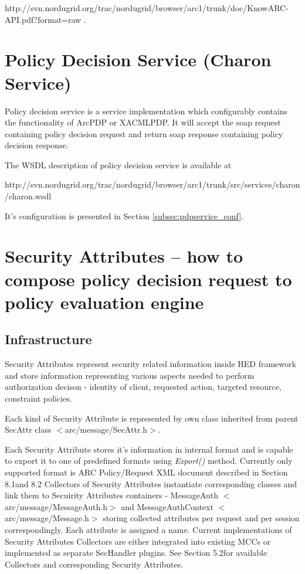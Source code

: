 \documentclass{article}                            %
\begin{document}
http://svn.nordugrid.org/trac/nordugrid/browser/arc1/trunk/doc/KnowARC-API.pdf?format=raw .



\section{Policy Decision Service (Charon Service)} %
\label{sec:policy_decision_service}
Policy decision service is a service implementation which configurably contains the functionality of ArcPDP or XACMLPDP. It will accept the soap request containing policy decision request and return soap response containing policy decision response.

The WSDL description of policy decision service is available at

 http://svn.nordugrid.org/trac/nordugrid/browser/arc1/trunk/src/services/charon/charon.wsdl

It's configuration is presented in Section \ref{subsec:pdpservice_conf}. 



\section{Security Attributes -- how to compose policy decision request to policy evaluation engine} %
\label{sec:sec_attributes}

\subsection{Infrastructure} %
\label{subsec:sec_attr_infrastructure}

Security Attributes represent security related information inside HED framework and store information representing various aspects needed to perform authorization decison - identity of client, requested action, targeted resource, constraint policies.

Each kind of Security Attribute is represented by own class inherited from parent SecAttr class $<$arc/message/SecAttr.h$>$. 

Each Security Attribute stores it's information in internal format and is capable to export it to one of predefined formats using \textit{Export()} method. Currently only supported format is ARC Policy/Request XML document described in Section 8.1and 8.2
Collectors of Security Attributes instantiate corresponding classes and link them to Secuirity Attributes containers - MessageAuth $<$arc/message/MessageAuth.h$>$ and MessageAuthContext $<$arc/message/Message.h$>$ storing collected attributes per request and per session correspondingly. Each attribute is assigned a name. Current implementations of Security Attributes Collectors are either integrated into existing MCCs or implemented as separate SecHandler plugins. See Section 5.2for available Collectors and corresponding Security Attributes. 
\end{document}
